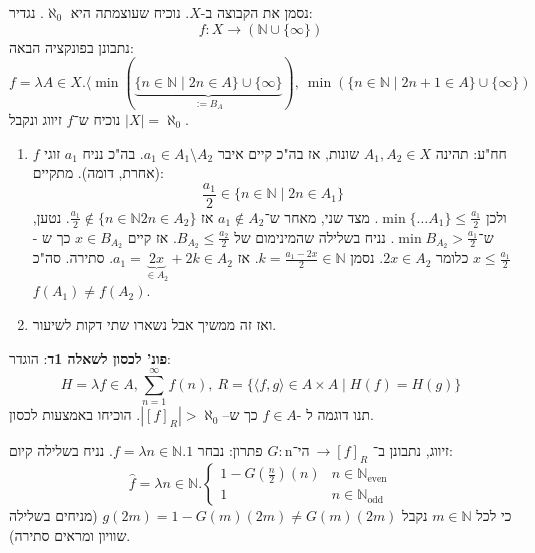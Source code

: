 \documentclass[]{article}
\newcommand\N     {\mathbb{N}}
\newcommand\Neven {\N_{\mathrm{even}}}
\newcommand\Nodd  {\N_{\mathrm{odd }}}
\newcommand\ra    {\rangle}
\newcommand\la    {\langle}
\newcommand\az    {\aleph_0}
\newcommand\n     {$n$־יה\ }
\renewcommand\inf {\infty}
\newcommand\sof[1]    {\left | #1 \right |}
\newcommand\cl [1]    {\left ( #1 \right )}
\begin{document}
	נסמן את הקבוצה ב-$X$. נוכיח שעוצמתה היא $\az$. נגדיר: 
	\[ f \colon X \to (\N \cup \{\inf\}) \]
	נתבונן בפונקציה הבאה: 
	\[ f = \lambda A \in X. \la \min (\underbrace{\{n \in \N \mid 2n \in A\} \cup \{\inf\}}_{:= B_A}), \ \min (\{n \in \N \mid 2n + 1\in A\} \cup \{\inf\}) \]
	נוכיח ש־$f$ זיווג ונקבל $|X| = \az$. 
	
	\begin{enumerate}
		\item $f$ חח"ע: תהינה $A_1, A_2 \in X$ שונות, אז בה"כ קיים איבר $a_1 \in A_1 \setminus A_2$. בה"כ נניח $a_1$ זוגי (אחרת, דומה). מתקיים: 
		\[ \frac{a_1}{2} \in \{n \in \N \mid 2n \in A_1\}  \]
		ולכן $\min\{\dots A_1\} \le \frac{a_1}{2}$. מצד שני, מאחר ש־$a_1 \not\in A_2$ אז $\frac{a_1}{2} \notin \{n \in \N 2n \in A_2\}$. נטען, ש־$\min B_{A_2} > \frac{a_1}{2}$. נניח בשלילה שהמינימום של $B_{A_2} \le \frac{a_2}{2}$. אז קיים $x \in B_{A_2}$ כך ש -$x \le \frac{a_1}{2}$ כלומר $2x \in A_2$. נסמן $k = \frac{a_1 - 2x}{2}\in \N$. אז $a_1 = \underbrace{2x}_{\in A_2} + 2k \in A_2$. סתירה. סה"כ $f(A_1) \neq f(A_2)$. 
		\item ואז זה ממשיך אבל נשארו שתי דקות לשיעור. 
	\end{enumerate}
	
	\textbf{פונ' לכסון לשאלה 1ד}: 
	הוגדר: 
	\[ H = \lambda f \in A, \sum_{n = 1}^{\inf}f(n), \ R = \{\la f, g \ra \in A \times A \mid H(f) = H(g)\} \]
	תנו דוגמה ל -$f \in A$ כך ש–$\sof{[f]_R} > \az$. הוכיחו באמצעות לכסון. 
	
	פתרון: נבחר $f = \lambda n \in \N. 1$. נניח בשלילה קיום $G \colon \n \to [f]_R$ זיווג, נתבונן ב־: 
	\[ \hat f = \lambda n \in \N. \begin{cases}
		1 - G\cl{\frac{n}{2}}\cl{n} & n \in \Neven \\
		1 & n \in \Nodd
	\end{cases} \]
	כי לכל $m \in \N$ נקבל $g(2m) = 1 - G(m)(2m) \neq G(m)(2m)$ (מניחים בשלילה שוויון ומראים סתירה). 
\end{document}
